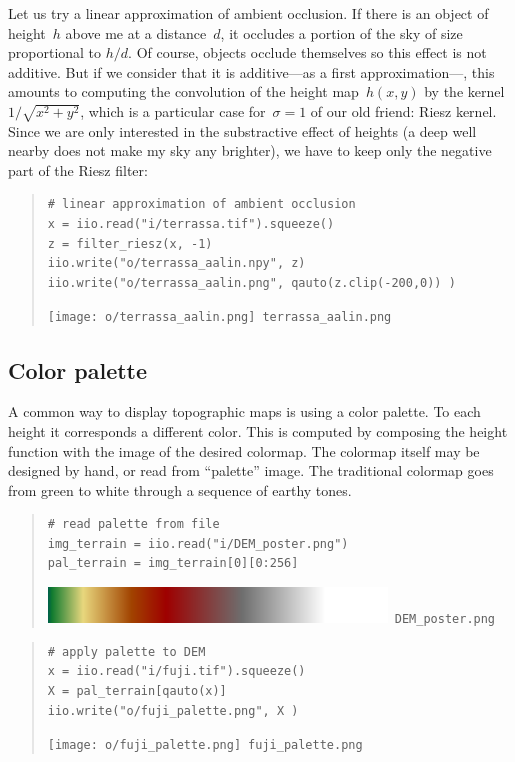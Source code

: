 Let us try a linear approximation of ambient occlusion.  If there is an object
of height~$h$ above me at a distance~$d$, it occludes a portion of the sky of
size proportional to $h/d$.  Of course, objects occlude themselves so this
effect is not additive.  But if we consider that it is additive---as a first
approximation---, this amounts to computing the convolution of the height
map~$h(x,y)$ by the kernel~$1/\sqrt{x^2+y^2}$, which is a particular case
for~$\sigma=1$ of our old friend: Riesz kernel.  Since we are only interested
in the substractive effect of heights (a deep well nearby does not make my
sky any brighter), we have to keep only the negative part of the Riesz
filter:

\begin{quote}
\begin{verbatim}
# linear approximation of ambient occlusion
x = iio.read("i/terrassa.tif").squeeze()
z = filter_riesz(x, -1)
iio.write("o/terrassa_aalin.npy", z)
iio.write("o/terrassa_aalin.png", qauto(z.clip(-200,0)) )
\end{verbatim}
\texttt{[image: o/terrassa\_aalin.png]}~\verb+terrassa_aalin.png+
\end{quote}



\clearpage
\subsection{Color palette}

A common way to display topographic maps is using a color palette.
To each height it corresponds a different color.  This is computed by
composing the height function with the image of the desired colormap.  The
colormap itself may be designed by hand, or read from ``palette'' image.
The traditional colormap goes from green to white through a sequence of
earthy tones.

\begin{quote}
\begin{verbatim}
# read palette from file
img_terrain = iio.read("i/DEM_poster.png")
pal_terrain = img_terrain[0][0:256]
\end{verbatim}
\includegraphics{i/DEM_poster.png}~\verb+DEM_poster.png+
\end{quote}

\begin{quote}
\begin{verbatim}
# apply palette to DEM
x = iio.read("i/fuji.tif").squeeze()
X = pal_terrain[qauto(x)]
iio.write("o/fuji_palette.png", X )
\end{verbatim}
\texttt{[image: o/fuji\_palette.png]}~\verb+fuji_palette.png+
\end{quote}

